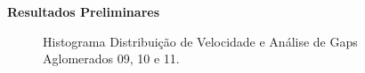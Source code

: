 \documentclass[xcolor=dvipsnames,10pt]{beamer}
\begin{document}
\begin{frame}{\textbf{Resultados Preliminares}}
\begin{figure}[!htbp]
    \caption{Histograma Distribuição de Velocidade e Análise de Gaps Aglomerados 09, 10 e 11.}
  \end{figure}
\end{frame}
\end{document}
